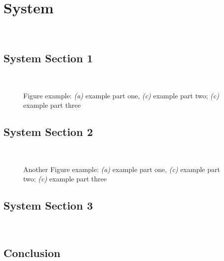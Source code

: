 %
\chapter{System}
~\label{sec:system}




\section{System Section 1}
~\label{sec:system:sec1}



\begin{figure}[htb]
	\caption{Figure example: \textit{(a)} example part one, \textit{(c)} example part two; \textit{(c)} example part three}\label{fig:system:example1}
\end{figure}



\section{System Section 2}
~\label{sec:system:sec2}



\begin{figure}[htb]
	\caption{Another Figure example: \textit{(a)} example part one, \textit{(c)} example part two; \textit{(c)} example part three}\label{fig:system:example2}
\end{figure}



\section{System Section 3}
~\label{sec:system:sec3}



\section{Conclusion}
~\label{sec:system:conclusion}


